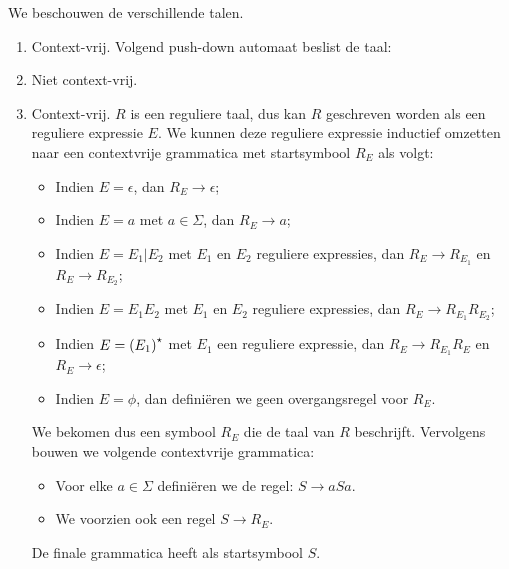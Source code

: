 \documentclass{article}
\begin{document}
\begin{answer}
We beschouwen de verschillende talen.
\begin{enumerate}
 \item Context-vrij. Volgend push-down automaat beslist de taal:
 \begin{center}
 \end{center}
 \item Niet context-vrij.
 \item Context-vrij. $R$ is een reguliere taal, dus kan $R$ geschreven worden als een reguliere expressie $E$. We kunnen deze reguliere expressie inductief omzetten naar een contextvrije grammatica met startsymbool $R_E$ als volgt:
 \begin{itemize}
  \item Indien $E=\epsilon$, dan $R_E\rightarrow\epsilon$;
  \item Indien $E=a$ met $a\in\Sigma$, dan $R_E\rightarrow a$;
  \item Indien $E=E_1|E_2$ met $E_1$ en $E_2$ reguliere expressies, dan $R_E\rightarrow R_{E_1}$ en $R_E\rightarrow R_{E_2}$;
  \item Indien $E=E_1E_2$ met $E_1$ en $E_2$ reguliere expressies, dan $R_E\rightarrow R_{E_1}R_{E_2}$;
  \item Indien $E=\left( E_1 \right)^\star$ met $E_1$ een reguliere expressie, dan $R_E\rightarrow R_{E_1}R_E$ en $R_E\rightarrow \epsilon$;
  \item Indien $E=\phi$, dan defini\"eren we geen overgangsregel voor $R_E$.
 \end{itemize}
We bekomen dus een symbool $R_E$ die de taal van $R$ beschrijft. Vervolgens bouwen we volgende contextvrije grammatica:
\begin{itemize}
 \item Voor elke $a\in\Sigma$ defini\"eren we de regel: $S\rightarrow aSa$.
 \item We voorzien ook een regel $S\rightarrow R_E$.
\end{itemize}
De finale grammatica heeft als startsymbool $S$.
\end{enumerate}
\end{answer}
\end{document}
